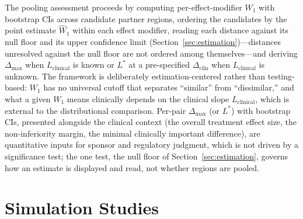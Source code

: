 \documentclass[AMA,Times1COL]{WileyNJDv5}
\begin{document}
The pooling assessment proceeds by computing per-effect-modifier $W_1$ with bootstrap CIs across candidate partner regions, ordering the candidates by the point estimate $\widehat{W}_1$ within each effect modifier, reading each distance against its null floor and its upper confidence limit (Section~\ref{sec:estimation})---distances unresolved against the null floor are not ordered among themselves---and deriving $\Delta_{\max}$ when $L_{\text{clinical}}$ is known or $L^*$ at a pre-specified $\Delta_{\text{clin}}$ when $L_{\text{clinical}}$ is unknown. The framework is deliberately estimation-centered rather than testing-based: $W_1$ has no universal cutoff that separates ``similar'' from ``dissimilar,'' and what a given $W_1$ means clinically depends on the clinical slope $L_{\text{clinical}}$, which is external to the distributional comparison. Per-pair $\Delta_{\max}$ (or $L^*$) with bootstrap CIs, presented alongside the clinical context (the overall treatment effect size, the non-inferiority margin, the minimal clinically important difference), are quantitative inputs for sponsor and regulatory judgment, which is not driven by a significance test;\cite{wasserstein2016} the one test, the null floor of Section~\ref{sec:estimation}, governs how an estimate is displayed and read, not whether regions are pooled.

\section{Simulation Studies}\label{sec:simulation}
\end{document}

